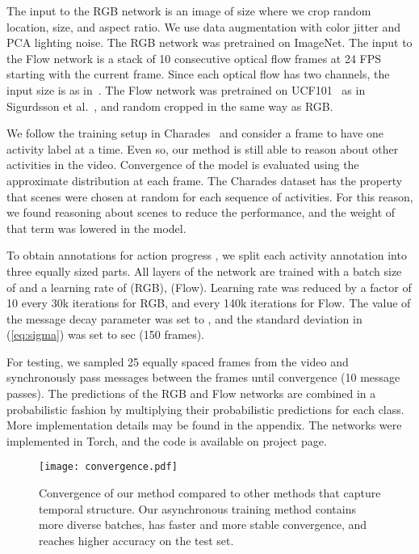 \documentclass[10pt,twocolumn,letterpaper]{article}
\begin{document}
The input to the RGB network is an image of size  where we crop random location, size, and aspect ratio. We use data augmentation with color jitter and PCA lighting noise. The RGB network was pretrained on ImageNet. The input to the Flow network is a stack of 10 consecutive optical flow frames at 24 FPS starting with the current frame. Since each optical flow has two channels, the input size is  as in~\cite{2stream14}. The Flow network was pretrained on UCF101~\cite{UCF101} as in Sigurdsson et al.~\cite{charades}, and random cropped in the same way as RGB. 

We follow the training setup in Charades~\cite{charades} and consider a frame to have one activity label at a time. Even so, our method is still able to reason about other activities in the video. Convergence of the model is evaluated using the approximate distribution  at each frame. The Charades dataset has the property that scenes were chosen at random for each sequence of activities. For this reason, we found reasoning about scenes to reduce the performance, and the weight of that term was lowered in the model.

To obtain annotations for action progress , we split each activity annotation into three equally sized parts. All layers of the network are trained with a batch size of  and a learning rate of  (RGB),  (Flow). Learning rate was reduced by a factor of 10 every 30k iterations for RGB, and every 140k iterations for Flow. The value of the message decay parameter  was set to , and the standard deviation  in (\ref{eq:sigma}) was set to  sec (150 frames).

For testing, we sampled 25 equally spaced frames from the video and synchronously pass messages between the frames until convergence (10 message passes). The predictions of the RGB and Flow networks are combined in a probabilistic fashion by multiplying their probabilistic predictions for each class. More implementation details may be found in the appendix. The networks were implemented in Torch, and the code is available on project page.


\begin{figure}[t]
\centering
\texttt{[image: convergence.pdf]}
\caption{Convergence of our method compared to other methods that capture temporal structure. Our asynchronous training method contains more diverse batches, has faster and more stable convergence, and reaches higher accuracy on the test set.}
\label{fig:convergence}
\end{figure}
\end{document}
